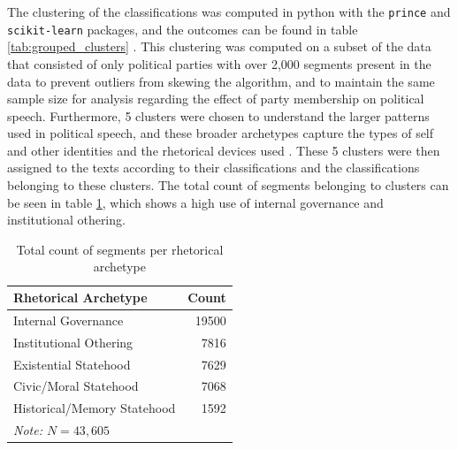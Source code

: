 The clustering of the classifications was computed in python with the \texttt{prince} and \texttt{scikit-learn} packages, and the outcomes can be found in table \ref{tab:grouped_clusters} \citep{Halford_Prince,scikit-learn}. This clustering was computed on a subset of the data that consisted of only political parties with over 2,000 segments present in the data to prevent outliers from skewing the algorithm, and to maintain the same sample size for analysis regarding the effect of party membership on political speech. Furthermore, 5 clusters were chosen to understand the larger patterns used in political speech, and these broader archetypes capture the types of self and other identities and the rhetorical devices used \citep[pg.~9]{senn2025}. These 5 clusters were then assigned to the texts according to their classifications and the classifications belonging to these clusters. The total count of segments belonging to clusters can be seen in table \ref{tab:cluster_count}, which shows a high use of internal governance and institutional othering.

\begin{table}[htbp]
    \centering
    \caption{Total count of segments per rhetorical archetype}

    \begin{tabular}{lr}
    \toprule
    Rhetorical Archetype & Count \\
    \midrule
    Internal Governance & 19500 \\
    Institutional Othering & 7816 \\
    Existential Statehood & 7629 \\
    Civic/Moral Statehood & 7068 \\
    Historical/Memory Statehood & 1592 \\
    \bottomrule
    \textit{Note: $N=43,605$}
    \end{tabular}
    \label{tab:cluster_count}

\end{table}

